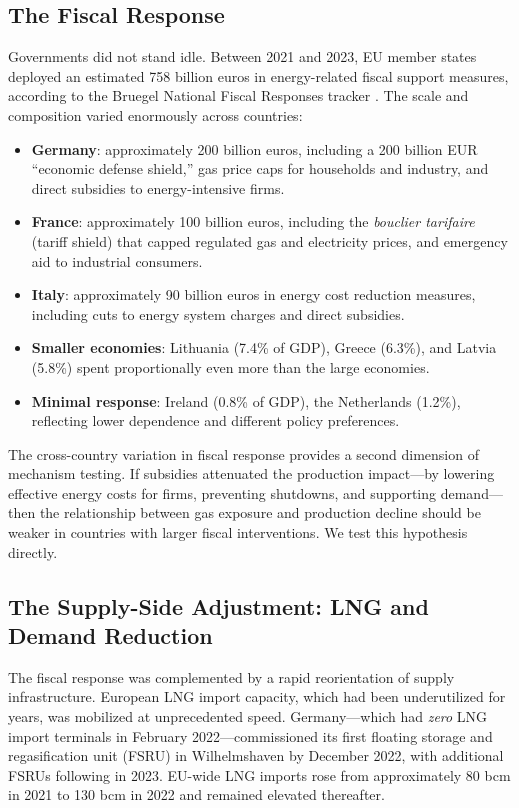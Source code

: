 \documentclass[12pt]{article}
\begin{document}
\subsection{The Fiscal Response}

Governments did not stand idle. Between 2021 and 2023, EU member states deployed an estimated 758 billion euros in energy-related fiscal support measures, according to the Bruegel National Fiscal Responses tracker \citep{bruegel2023}. The scale and composition varied enormously across countries:

\begin{itemize}
    \item \textbf{Germany}: approximately 200 billion euros, including a 200 billion EUR ``economic defense shield,'' gas price caps for households and industry, and direct subsidies to energy-intensive firms.
    \item \textbf{France}: approximately 100 billion euros, including the \textit{bouclier tarifaire} (tariff shield) that capped regulated gas and electricity prices, and emergency aid to industrial consumers.
    \item \textbf{Italy}: approximately 90 billion euros in energy cost reduction measures, including cuts to energy system charges and direct subsidies.
    \item \textbf{Smaller economies}: Lithuania (7.4\% of GDP), Greece (6.3\%), and Latvia (5.8\%) spent proportionally even more than the large economies.
    \item \textbf{Minimal response}: Ireland (0.8\% of GDP), the Netherlands (1.2\%), reflecting lower dependence and different policy preferences.
\end{itemize}

The cross-country variation in fiscal response provides a second dimension of mechanism testing. If subsidies attenuated the production impact---by lowering effective energy costs for firms, preventing shutdowns, and supporting demand---then the relationship between gas exposure and production decline should be weaker in countries with larger fiscal interventions. We test this hypothesis directly.

\subsection{The Supply-Side Adjustment: LNG and Demand Reduction}

The fiscal response was complemented by a rapid reorientation of supply infrastructure. European LNG import capacity, which had been underutilized for years, was mobilized at unprecedented speed. Germany---which had \textit{zero} LNG import terminals in February 2022---commissioned its first floating storage and regasification unit (FSRU) in Wilhelmshaven by December 2022, with additional FSRUs following in 2023. EU-wide LNG imports rose from approximately 80 bcm in 2021 to 130 bcm in 2022 and remained elevated thereafter.
\end{document}
